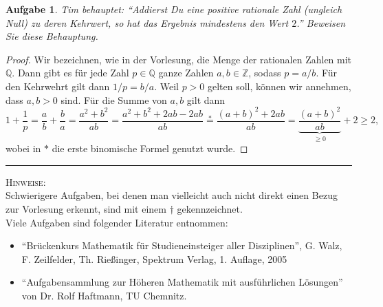 \documentclass[11pt]{article}
\theoremstyle{generalpurposedef}
\theoremstyle{generalpurposetsk}
\newtheorem{htask}[task]{Aufgabe}
\begin{document}
\begin{htask}
	Tim behauptet: ``Addierst Du eine positive rationale Zahl (ungleich Null) zu deren Kehrwert, so hat das Ergebnis mindestens den Wert $2$.'' Beweisen Sie diese Behauptung.
\end{htask}
\begin{proof}
	Wir bezeichnen, wie in der Vorlesung, die Menge der rationalen Zahlen mit $\mathbb{Q}$. Dann gibt es für jede Zahl $p\in \mathbb{Q}$ ganze Zahlen $a,b\in \mathbb{Z}$, sodass $p = a/b$. Für den Kehrwehrt gilt dann $1/p = b/a$. Weil $p>0$ gelten soll, können wir annehmen, dass $a,b>0$ sind. Für die Summe von $a,b$ gilt dann
	\[
	1+\frac{1}{p} =  \frac{a}{b} + \frac{b}{a}= \frac{a^2+b^2}{ab} = \frac{a^2+b^2+2ab-2ab}{ab} \overset{\ast}{=} \frac{(a+b)^2+2ab}{ab} = \underbrace{\frac{(a+b)^2}{ab}}_{\geq 0} + 2 \geq 2,
	\]
	wobei in $\ast$ die erste binomische Formel genutzt wurde.
	
\end{proof}	
\hrule
\vspace{.5cm}
\noindent
\textsc{Hinweise:}\\
Schwierigere Aufgaben, bei denen man vielleicht auch nicht direkt einen Bezug zur Vorlesung erkennt, sind mit einem $\dagger$ gekennzeichnet.\\
Viele Aufgaben sind folgender Literatur entnommen:
\begin{itemize}
	\item ``Br\"uckenkurs Mathematik f\"ur Studieneinsteiger aller Disziplinen'', G. Walz, F. Zeilfelder, Th. Rie\ss inger, Spektrum Verlag, 1. Auflage, 2005
	\item ``Aufgabensammlung zur H\"oheren Mathematik mit ausf\"uhrlichen L\"osungen'' von Dr. Rolf Haftmann, TU Chemnitz.
\end{itemize}
\end{document}
